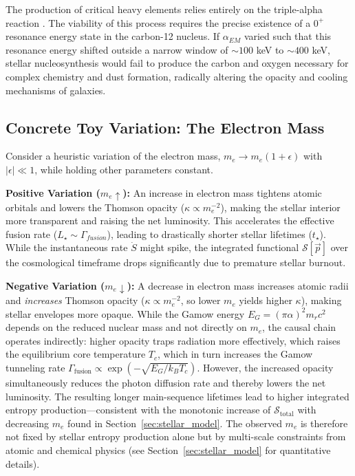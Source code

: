 \documentclass[12pt,a4paper]{article}
\theoremstyle{remark}
\begin{document}
The production of critical heavy elements relies entirely on the triple-alpha reaction \citep{Adams2019}. The viability of this process requires the precise existence of a $0^+$ resonance energy state in the carbon-12 nucleus. If $\alpha_{EM}$ varied such that this resonance energy shifted outside a narrow window of $\sim 100$ keV to $\sim 400$ keV, stellar nucleosynthesis would fail to produce the carbon and oxygen necessary for complex chemistry and dust formation, radically altering the opacity and cooling mechanisms of galaxies.

\subsection{Concrete Toy Variation: The Electron Mass}

Consider a heuristic variation of the electron mass, $m_e \to m_e(1+\epsilon)$ with $|\epsilon| \ll 1$, while holding other parameters constant.

\textbf{Positive Variation ($m_e \uparrow$):} An increase in electron mass tightens atomic orbitals and lowers the Thomson opacity ($\kappa \propto m_e^{-2}$), making the stellar interior more transparent and raising the net luminosity. This accelerates the effective fusion rate ($L_\star \sim \Gamma_{fusion}$), leading to drastically shorter stellar lifetimes ($t_\star$). While the instantaneous rate $\dot{S}$ might spike, the integrated functional $\mathcal{S}[\vec{p}]$ over the cosmological timeframe drops significantly due to premature stellar burnout.

\textbf{Negative Variation ($m_e \downarrow$):} A decrease in electron mass increases atomic radii and \emph{increases} Thomson opacity ($\kappa \propto m_e^{-2}$, so lower $m_e$ yields higher $\kappa$), making stellar envelopes more opaque. While the Gamow energy $E_G = (\pi \alpha)^2 m_r c^2$ depends on the reduced nuclear mass and not directly on $m_e$, the causal chain operates indirectly: higher opacity traps radiation more effectively, which raises the equilibrium core temperature $T_c$, which in turn increases the Gamow tunneling rate $\Gamma_{\text{fusion}} \propto \exp(-\sqrt{E_G / k_B T_c})$. However, the increased opacity simultaneously reduces the photon diffusion rate and thereby lowers the net luminosity. The resulting longer main-sequence lifetimes lead to higher integrated entropy production---consistent with the monotonic increase of $\mathcal{S}_{\text{total}}$ with decreasing $m_e$ found in Section~\ref{sec:stellar_model}. The observed $m_e$ is therefore not fixed by stellar entropy production alone but by multi-scale constraints from atomic and chemical physics (see Section~\ref{sec:stellar_model} for quantitative details).
\end{document}
